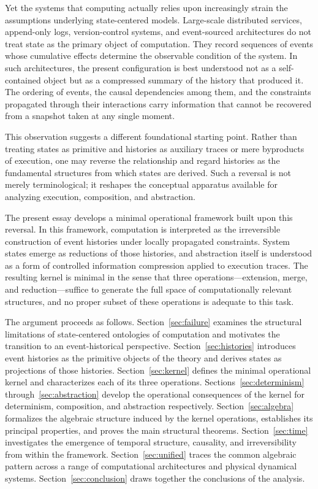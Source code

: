 \documentclass[12pt]{article}
\begin{document}
Yet the systems that computing actually relies upon increasingly strain the assumptions underlying state-centered models. Large-scale distributed services, append-only logs, version-control systems, and event-sourced architectures do not treat state as the primary object of computation. They record sequences of events whose cumulative effects determine the observable condition of the system. In such architectures, the present configuration is best understood not as a self-contained object but as a compressed summary of the history that produced it. The ordering of events, the causal dependencies among them, and the constraints propagated through their interactions carry information that cannot be recovered from a snapshot taken at any single moment.

This observation suggests a different foundational starting point. Rather than treating states as primitive and histories as auxiliary traces or mere byproducts of execution, one may reverse the relationship and regard histories as the fundamental structures from which states are derived. Such a reversal is not merely terminological; it reshapes the conceptual apparatus available for analyzing execution, composition, and abstraction.

The present essay develops a minimal operational framework built upon this reversal. In this framework, computation is interpreted as the irreversible construction of event histories under locally propagated constraints. System states emerge as reductions of those histories, and abstraction itself is understood as a form of controlled information compression applied to execution traces. The resulting kernel is minimal in the sense that three operations---extension, merge, and reduction---suffice to generate the full space of computationally relevant structures, and no proper subset of these operations is adequate to this task.

The argument proceeds as follows. Section~\ref{sec:failure} examines the structural limitations of state-centered ontologies of computation and motivates the transition to an event-historical perspective. Section~\ref{sec:histories} introduces event histories as the primitive objects of the theory and derives states as projections of those histories. Section~\ref{sec:kernel} defines the minimal operational kernel and characterizes each of its three operations. Sections~\ref{sec:determinism} through~\ref{sec:abstraction} develop the operational consequences of the kernel for determinism, composition, and abstraction respectively. Section~\ref{sec:algebra} formalizes the algebraic structure induced by the kernel operations, establishes its principal properties, and proves the main structural theorems. Section~\ref{sec:time} investigates the emergence of temporal structure, causality, and irreversibility from within the framework. Section~\ref{sec:unified} traces the common algebraic pattern across a range of computational architectures and physical dynamical systems. Section~\ref{sec:conclusion} draws together the conclusions of the analysis.
\end{document}
